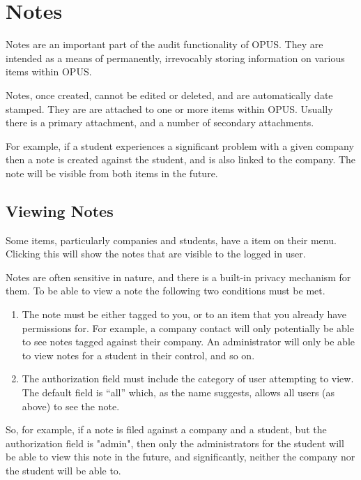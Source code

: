 \documentclass[12 pt]{book}
\begin{document}
%
%
%

\chapter{Notes}
\label{Notes}

Notes are an important part of the audit functionality of OPUS. They are
intended as a means of permanently, irrevocably storing information on various
items within OPUS.

Notes, once created, cannot be edited or deleted, and are automatically date
stamped. They are are attached to one or more items within OPUS. Usually there
is a primary attachment, and a number of secondary attachments.

For example, if a student experiences a significant problem with a given 
company then a note is created against the student, and is also linked to the
company. The note will be visible from both items in the future.

\section{Viewing Notes}

Some items, particularly companies and students, have a  item
on their menu. Clicking this will show the notes that are visible to the logged
in user.

Notes are often sensitive in nature, and there is a built-in privacy mechanism
for them. To be able to view a note the following two conditions must be met.

\begin{enumerate}
\item The note must be either tagged to you, or to an item that you already
have permissions for. For example, a company contact will only potentially be
able to see notes tagged against their company. An administrator will
only be able to view notes for a student in their control, and so on.
\item The authorization field must include the category of user attempting to
view. The default field is ``all'' which, as the name suggests, allows all
users (as above) to see the note.
\end{enumerate}

So, for example, if a note is filed against a company and a student, but the
authorization field is "admin", then only the administrators for the student
will be able to view this note in the future, and significantly, neither the
company nor the student will be able to.
\end{document}
